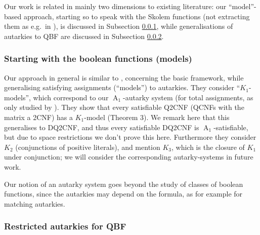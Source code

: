 \documentclass[conference]{IEEEtran}
\DeclareMathOperator{\Aaut}{A}
\begin{document}
Our work is related in mainly two dimensions to existing literature:
our ``model''-based approach, starting so to speak with the Skolem functions (not extracting them as e.g.\ in \cite{WWSB2016DQBF}), is discussed in Subsection \ref{sec:introstartbf}, while generalisations of autarkies to QBF are discussed in Subsection \ref{sec:introautqbf}.


\subsubsection{Starting with the boolean functions (models)}
\label{sec:introstartbf}

Our approach in general is similar to \cite{HKBSubramaniZhao2003BooleanModels}, concerning the basic framework, while generalising satisfying assignments (``models'') to autarkies.
They consider ``$K_1$-models'', which correspond to our $\Aaut_1$-autarky system (for total assignments, as only studied by  \cite{HKBSubramaniZhao2003BooleanModels}).
They show that every satisfiable Q2CNF (QCNFs with the matrix a 2CNF) has a $K_1$-model (Theorem 3).
We remark here that this generalises to DQ2CNF, and thus every satisfiable DQ2CNF is $\Aaut_1$-satisfiable, but due to space restrictions we don't prove this here.
Furthermore they consider $K_2$ (conjunctions of positive literals), and mention $K_3$, which is the closure of $K_1$ under conjunction; we will consider the corresponding autarky-systems in future work.

Our notion of an autarky system goes beyond the study of classes of boolean functions, since the autarkies may depend on the formula, as for example for matching autarkies.


\subsubsection{Restricted autarkies for QBF}
\label{sec:introautqbf}
\end{document}
